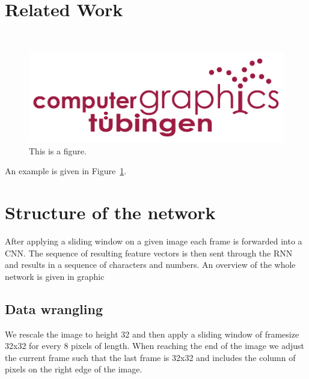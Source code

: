 \documentclass{utue} %
\begin{document}
\section{Related Work}

~\cite{2015arXiv150604395H}

\begin{figure}[h!]
  \centering
  \includegraphics[width=.9\columnwidth]{images/tuebingen4b_um_rot_small.pdf}
  \caption{\label{fig:figure1}This is a figure.}
\end{figure}
An example is given in Figure~\ref{fig:figure1}.

\section{Structure of the network}
After applying a sliding window on a given image each frame is forwarded into a CNN. The sequence of resulting feature vectors is then sent through the RNN and results in a sequence of characters and numbers. An overview of the whole network is given in graphic %

\subsection{Data wrangling}
We rescale the image to height 32 and then apply a sliding window of framesize 32x32 for every 8 pixels of length. When reaching the end of the image we adjust the current frame such that the last frame is 32x32 and includes the column of pixels on the right edge of the image. 
\end{document}
